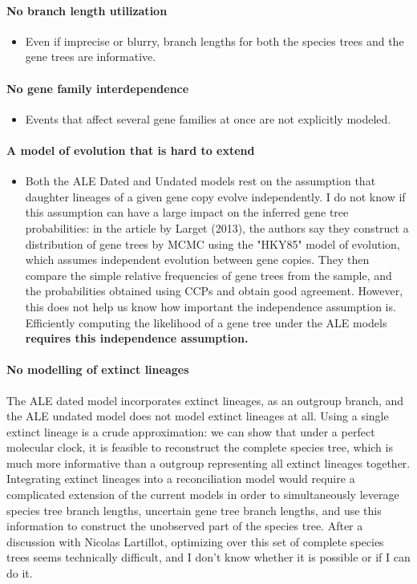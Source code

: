 \documentclass{article}
\newcommand{\1}{\mathbf{1}}
\begin{document}
\paragraph{No branch length utilization}
\begin{itemize}
    \item Even if imprecise or blurry, branch lengths for both the species trees and the gene trees are informative. 
\end{itemize}
\paragraph{No gene family interdependence}
\begin{itemize}
    \item Events that affect several gene families at once are not explicitly modeled.
\end{itemize}
\paragraph{A model of evolution that is hard to extend}
\begin{itemize}
    \item Both the ALE Dated and Undated models rest on the assumption that daughter lineages of a given gene copy evolve independently. I do not know if this assumption can have a large impact on the inferred gene tree probabilities: in the article by Larget (2013), the authors say they construct a distribution of gene trees by MCMC using the "HKY85" model of evolution, which assumes independent evolution between gene copies. They then compare the simple relative frequencies of gene trees from the sample, and the probabilities obtained using CCPs and obtain good agreement. However, this does not help us know how important the independence assumption is. Efficiently computing the likelihood of a gene tree under the ALE models \textbf{requires this independence assumption.}
\end{itemize}
\paragraph{No modelling of extinct lineages}
The ALE dated model incorporates extinct lineages, as an outgroup branch, and the ALE undated model does not model extinct lineages at all. Using a single extinct lineage is a crude approximation: we can show that under a perfect molecular clock, it is feasible to reconstruct the complete species tree, which is much more informative than a outgroup representing all extinct lineages together. Integrating extinct lineages into a reconciliation model would require a complicated extension of the current models in order to simultaneously leverage species tree branch lengths, uncertain gene tree branch lengths, and use this information to construct the unobserved part of the species tree. After a discussion with Nicolas Lartillot, optimizing over this set of complete species trees seems technically difficult, and I don't know whether it is possible or if I can do it.
\end{document}
